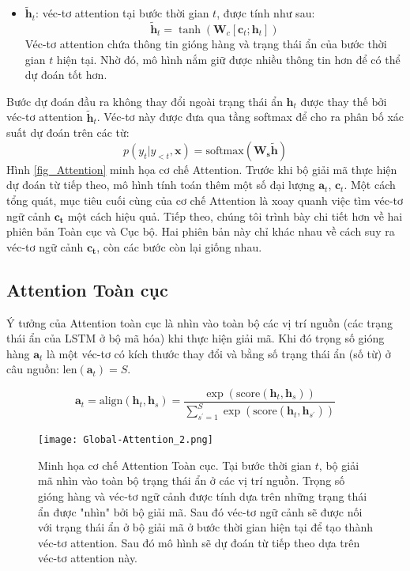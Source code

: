 \begin{itemize}
	\item $\bm{\tilde{h}}_t$: véc-tơ attention tại bước thời gian $t$, được tính như sau:
	\begin{equation}
	\boldsymbol{\tilde{h}}_t = \tanh(\bm{W}_c[\bm{c}_t;\bm{h}_t])
	\end{equation}
	Véc-tơ attention chứa thông tin gióng hàng và trạng thái ẩn của bước thời gian $t$ hiện tại. Nhờ đó, mô hình nắm giữ được nhiều thông tin hơn để có thể dự đoán tốt hơn.
\end{itemize}
Bước dự đoán đầu ra không thay đổi ngoài trạng thái ẩn $\bm{h}_t$ được thay thế bởi véc-tơ attention $\bm{\tilde{h}}_t$. Véc-tơ này được đưa qua tầng softmax để cho ra phân bố xác suất dự đoán trên các từ:
\begin{equation}
p(y_t | y_{<t}, \bm{x}) = \text{softmax}(\bm{W_s\tilde{h}})
\end{equation}
Hình \ref{fig_Attention} minh họa cơ chế Attention. Trước khi bộ giải mã thực hiện dự đoán từ tiếp theo, mô hình tính toán thêm một số đại lượng $\bm{a}_t$, $\bm{c}_t$. Một cách tổng quát, mục tiêu cuối cùng của cơ chế Attention là xoay quanh việc tìm véc-tơ ngữ cảnh $\bm{c_t}$ một cách hiệu quả.
Tiếp theo, chúng tôi trình bày chi tiết hơn về hai phiên bản Toàn cục và Cục bộ. Hai phiên bản này chỉ khác nhau về cách suy ra véc-tơ ngữ cảnh $\bm{c_t}$, còn các bước còn lại giống nhau.
\subsection{Attention Toàn cục}
Ý tưởng của Attention toàn cục là nhìn vào toàn bộ các vị trí nguồn (các trạng thái ẩn của LSTM ở bộ mã hóa) khi thực hiện giải mã.
Khi đó trọng số gióng hàng $\bm{a}_t$ là một véc-tơ có kích thước thay đổi và bằng số trạng thái ẩn (số từ) ở câu nguồn: $\text{len}(\bm{a}_t) = S$.

\begin{equation}
\bm{a}_t = \text{align}(\bm{h}_t, \bm{h}_s) = \frac{\exp\left(\text{score}(\bm{h}_t, \bm{h}_s)\right)}{\sum^{S}_{s^{'}=1}\exp\left(\text{score}(\bm{h}_t, \bm{h}_{s^{'}})\right)}
\end{equation}

\begin{figure}
	\centering
	\texttt{[image: Global-Attention\_2.png]}
	\caption[Minh họa cơ chế Attention Toàn cục.]{Minh họa cơ chế Attention Toàn cục. Tại bước thời gian $t$, bộ giải mã nhìn vào toàn bộ trạng thái ẩn ở các vị trí nguồn. Trọng số gióng hàng và véc-tơ ngữ cảnh được tính dựa trên những trạng thái ẩn được "nhìn" bởi bộ giải mã. Sau đó véc-tơ ngữ cảnh sẽ được nối với trạng thái ẩn ở bộ giải mã ở bước thời gian hiện tại để tạo thành véc-tơ attention. Sau đó mô hình sẽ dự đoán từ tiếp theo dựa trên véc-tơ attention này.}
	\label{fig_Global_Attention}
\end{figure}

